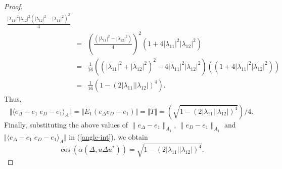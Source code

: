 \documentclass[10pt,a4paper]{amsart}
\begin{document}
\begin{proof}
\begin{eqnarray*}
                \frac{|\lambda_{11}|^2 |\lambda_{12}|^2
                  (|\lambda_{12}|^2 - |\lambda_{11}|^2)^2}{4}\\
 & = &                \left(\frac{(|\lambda_{11}|^2 -
                  |\lambda_{12}|^2)}{4}\right)^2 \left(1+ 4
                |\lambda_{11}|^2 |\lambda_{12}|^2\right)\\ & = &
                \frac{1}{16}\left( (|\lambda_{11}|^2 +
                |\lambda_{12}|^2)^2 - 4|\lambda_{11}|^2
                |\lambda_{12}|^2\right) \left( (1+4|\lambda_{11}|^2
                |\lambda_{12}|^2)\right)\\
                & = & \frac{1}{16} \left(1-(2 |\lambda_{11}||\lambda_{12}|)^4\right).
\end{eqnarray*}
        Thus,
        \[
         \Vert \langle e_\Delta - e_1 \; e_D - e_1 \rangle_{A}\Vert = \Vert E_1(e_\Delta e_D - e_1)\Vert 
   =  \Vert T \Vert
  =  \left(\sqrt{1- (2|\lambda_{11}| |\lambda_{12}|)^4}\right)/4.
        \]
Finally, substituting the above values of $\|e_\Delta -e_1 \|_{A_1}$,
$\|e_{D} -e_1 \|_{A_1}$ and $ \Vert \langle e_\Delta - e_1 \; e_D - e_1
\rangle_{A}\Vert $ in  (\ref{angle-int}), we obtain
\[
\cos(\alpha(\Delta, u\Delta u^*)) = \sqrt{1-(2 |\lambda_{11}| |\lambda_{12}|)^4}.
\]
  \end{proof}
\end{document}
